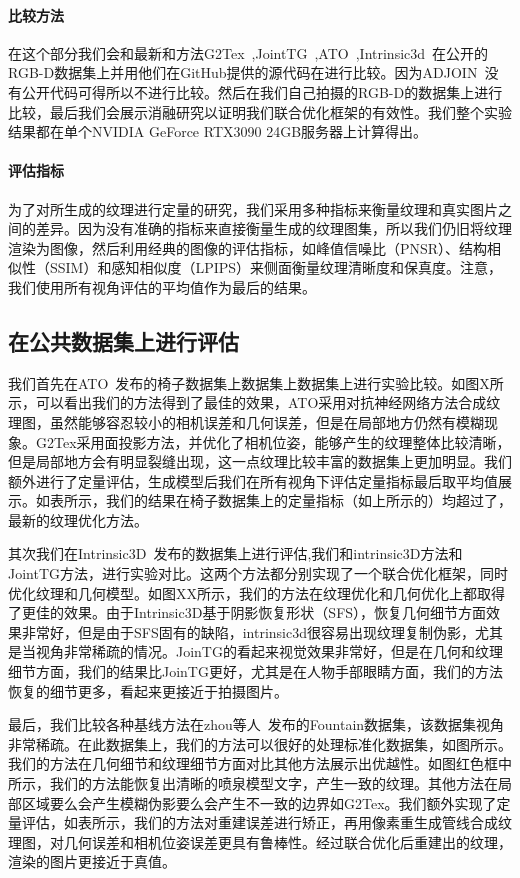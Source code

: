 \paragraph*{比较方法}
在这个部分我们会和最新和方法G2Tex~\cite{fu2018texture},JointTG~\cite{YanpingFu2020JointTA},ATO~\cite{JingweiHuang2020AdversarialTO},Intrinsic3d~\cite{RobertMaier2017Intrinsic3DH3}在公开的RGB-D数据集上并用他们在GitHub提供的源代码在进行比较。因为ADJOIN~\cite{9705143}没有公开代码可得所以不进行比较。然后在我们自己拍摄的RGB-D的数据集上进行比较，最后我们会展示消融研究以证明我们联合优化框架的有效性。我们整个实验结果都在单个NVIDIA GeForce RTX3090 24GB服务器上计算得出。


\paragraph*{评估指标}
为了对所生成的纹理进行定量的研究，我们采用多种指标来衡量纹理和真实图片之间的差异。因为没有准确的指标来直接衡量生成的纹理图集，所以我们仍旧将纹理渲染为图像，然后利用经典的图像的评估指标，如峰值信噪比（PNSR）、结构相似性（SSIM）和感知相似度（LPIPS）来侧面衡量纹理清晰度和保真度。注意，我们使用所有视角评估的平均值作为最后的结果。
\subsection{在公共数据集上进行评估}
我们首先在ATO~\cite{JingweiHuang2020AdversarialTO}发布的椅子数据集上数据集上数据集上进行实验比较。如图X所示，可以看出我们的方法得到了最佳的效果，ATO采用对抗神经网络方法合成纹理图，虽然能够容忍较小的相机误差和几何误差，但是在局部地方仍然有模糊现象。G2Tex采用面投影方法，并优化了相机位姿，能够产生的纹理整体比较清晰，但是局部地方会有明显裂缝出现，这一点纹理比较丰富的数据集上更加明显。我们额外进行了定量评估，生成模型后我们在所有视角下评估定量指标最后取平均值展示。如表所示，我们的结果在椅子数据集上的定量指标（如上所示的）均超过了，最新的纹理优化方法。\par
其次我们在Intrinsic3D~\cite{RobertMaier2017Intrinsic3DH3}发布的数据集上进行评估,我们和intrinsic3D方法和JointTG方法，进行实验对比。这两个方法都分别实现了一个联合优化框架，同时优化纹理和几何模型。如图XX所示，我们的方法在纹理优化和几何优化上都取得了更佳的效果。由于Intrinsic3D基于阴影恢复形状（SFS），恢复几何细节方面效果非常好，但是由于SFS固有的缺陷，intrinsic3d很容易出现纹理复制伪影，尤其是当视角非常稀疏的情况。JoinTG的看起来视觉效果非常好，但是在几何和纹理细节方面，我们的结果比JoinTG更好，尤其是在人物手部眼睛方面，我们的方法恢复的细节更多，看起来更接近于拍摄图片。\par
最后，我们比较各种基线方法在zhou等人~\cite{Zhou2018}发布的Fountain数据集，该数据集视角非常稀疏。在此数据集上，我们的方法可以很好的处理标准化数据集，如图所示。我们的方法在几何细节和纹理细节方面对比其他方法展示出优越性。如图红色框中所示，我们的方法能恢复出清晰的喷泉模型文字，产生一致的纹理。其他方法在局部区域要么会产生模糊伪影要么会产生不一致的边界如G2Tex。我们额外实现了定量评估，如表所示，我们的方法对重建误差进行矫正，再用像素重生成管线合成纹理图，对几何误差和相机位姿误差更具有鲁棒性。经过联合优化后重建出的纹理，渲染的图片更接近于真值。\par
